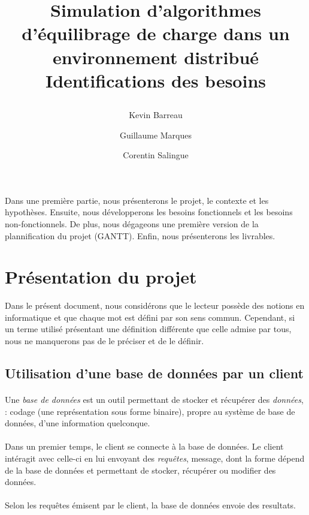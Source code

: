 \documentclass[12pt]{article}
\title{
 \begin{minipage}\linewidth
        \centering
        Simulation d'algorithmes d'équilibrage de charge dans un environnement distribué 
        \vskip3pt
        \large Identifications des besoins
    \end{minipage}
 }
\author{Kevin Barreau \and Guillaume Marques \and Corentin Salingue}
\begin{document}
\maketitle

\abstract
Dans une première partie, nous présenterons le projet, le contexte et les hypothèses. Ensuite, nous développerons les besoins fonctionnels et les besoins non-fonctionnels.
De plus, nous dégageons une première version de la plannification du projet (GANTT). Enfin, nous présenterons les livrables.



\newpage


\renewcommand{\contentsname}{Sommaire} 
\tableofcontents

\listoffigures

\newpage

\section{Présentation du projet}

Dans le présent document, nous considérons que le lecteur possède des notions en informatique et que chaque mot est défini par son sens commun. Cependant, si un terme utilisé présentant une définition différente que celle admise par tous, nous ne manquerons pas de le préciser et de le définir.

\subsection{Utilisation d'une base de données par un client}

\paragraph{} Une \textit{base de données} est un outil permettant de stocker et récupérer des \textit{données}, : codage (une représentation sous forme binaire), propre au système de base de données, d'une information quelconque.

\paragraph{} Dans un premier temps, le client se connecte à la base de données.
Le client intéragit avec celle-ci en lui envoyant des \textit{requêtes}, message, dont la forme dépend de la base de données et permettant de stocker, récupérer ou modifier des données.

\paragraph{}Selon les requêtes émisent par le client, la base de données envoie des resultats.
\end{document}
